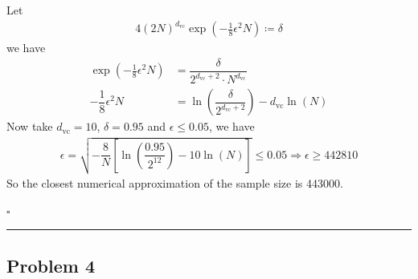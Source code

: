 \documentclass[12pt]{article}
\newcommand*{\QEDB}{\hfill\ensuremath{\square}}
\newcommand{\SBrackets}[1]{\left[#1\right]}
\newcommand{\ParTh}[1]{\left(#1\right)}
\newcommand{\horrule}[1]{\rule{\linewidth}{#1}}
\begin{document}
Let
\begin{align}
4\ParTh{2N}^{d_{\text{vc}}}\exp\ParTh{-\frac{1}{8}\epsilon^2N}\coloneqq\delta
\end{align}
we have
\begin{align}
\exp\ParTh{-\frac{1}{8}\epsilon^2N}&=\dfrac{\delta}{2^{d_{\text{vc}}+2}\cdot N^{d_{\text{vc}}}}\\
-\dfrac{1}{8}\epsilon^2N&=\ln\ParTh{\dfrac{\delta}{2^{d_{\text{vc}}+2}}}-d_{\text{vc}}\ln\ParTh{N}
\end{align}
Now take $d_{\text{vc}}=10$, $\delta=0.95$ and $\epsilon\leq0.05$, we have
\begin{align}
\epsilon=\sqrt{-\dfrac{8}{N}\SBrackets{\ln\ParTh{\dfrac{0.95}{2^{12}}}-10\ln\ParTh{N}}}\leq0.05\Rightarrow\epsilon\geq442810
\end{align}
So the closest numerical approximation of the sample size is 443000.

\QEDB

\horrule{0.5pt}

\subsection*{Problem 4}
\end{document}
